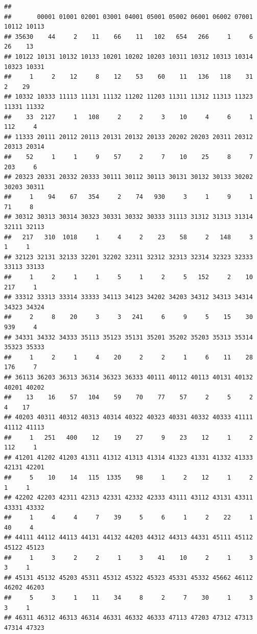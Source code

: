 \documentclass[
]{book}
\begin{document}
\begin{verbatim}
## 
##       00001 01001 02001 03001 04001 05001 05002 06001 06002 07001 10112 10113 
## 35630    44     2    11    66    11   102   654   266     1     6    26    13 
## 10122 10131 10132 10133 10201 10202 10203 10311 10312 10313 10314 10323 10331 
##     1     2    12     8    12    53    60    11   136   118    31     2    29 
## 10332 10333 11113 11131 11132 11202 11203 11311 11312 11313 11323 11331 11332 
##    33  2127     1   108     2     2     3    10     4     6     1   112     4 
## 11333 20111 20112 20113 20131 20132 20133 20202 20203 20311 20312 20313 20314 
##    52     1     1     9    57     2     7    10    25     8     7   203     6 
## 20323 20331 20332 20333 30111 30112 30113 30131 30132 30133 30202 30203 30311 
##     1    94    67   354     2    74   930     3     1     9     1    71     8 
## 30312 30313 30314 30323 30331 30332 30333 31113 31312 31313 31314 32111 32113 
##   217   310  1018     1     4     2    23    58     2   148     3     1     1 
## 32123 32131 32133 32201 32202 32311 32312 32313 32314 32323 32333 33113 33133 
##     1     2     1     1     5     1     2     5   152     2    10   217     1 
## 33312 33313 33314 33333 34113 34123 34202 34203 34312 34313 34314 34323 34324 
##     2     8    20     3     3   241     6     9     5    15    30   939     4 
## 34331 34332 34333 35113 35123 35131 35201 35202 35203 35313 35314 35323 35333 
##     1     2     1     4    20     2     2     1     6    11    28   176     7 
## 36113 36203 36313 36314 36323 36333 40111 40112 40113 40131 40132 40201 40202 
##    13    16    57   104    59    70    77    57     2     5     2     4    17 
## 40203 40311 40312 40313 40314 40322 40323 40331 40332 40333 41111 41112 41113 
##     1   251   400    12    19    27     9    23    12     1     2   112     1 
## 41201 41202 41203 41311 41312 41313 41314 41323 41331 41332 41333 42131 42201 
##     5    10    14   115  1335    98     1     2    12     1     2     1     1 
## 42202 42203 42311 42313 42331 42332 42333 43111 43112 43131 43311 43331 43332 
##     1     4     4     7    39     5     6     1     2    22     1    40     4 
## 44111 44112 44113 44131 44132 44203 44312 44313 44331 45111 45112 45122 45123 
##     1     3     2     2     1     3    41    10     2     1     3     3     1 
## 45131 45132 45203 45311 45312 45322 45323 45331 45332 45662 46112 46202 46203 
##     5     3     1    11    34     8     2     7    30     1     3     3     1 
## 46311 46312 46313 46314 46331 46332 46333 47113 47203 47312 47313 47314 47323 

\end{verbatim}
\end{document}
